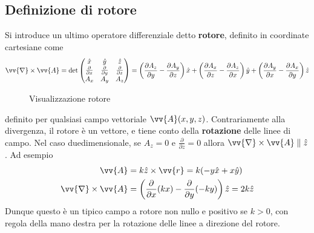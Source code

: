 \documentclass[a4paper, oneside]{book}
\begin{document}
\subsection{Definizione di rotore}
Si introduce un ultimo operatore differenziale detto \textbf{rotore}, definito 
in coordinate cartesiane come 
\begin{align}
    \vv{\nabla} \times \vv{A} = \det\begin{pmatrix}
        \hat{x} & \hat{y} & \hat{z} \\
        \frac{\partial }{\partial x} & \frac{\partial }{\partial y} & \frac{\partial }{\partial z} \\
        A_x & A_y & A_z      
    \end{pmatrix}  = \left(\frac{\partial A_z}{\partial y} - \frac{\partial A_y}{\partial z}  \right)\hat{x} + \left(\frac{\partial A_x}{\partial z} - \frac{\partial A_z}{\partial x}  \right) \hat{y} + \left(\frac{\partial A_y}{\partial x} - \frac{\partial A_x}{\partial y}  \right) \hat{z}   
\end{align}


\begin{figure}
    \centering
    \caption{Visualizzazione rotore}
\end{figure}\noindent
definito per qualsiasi campo vettoriale $\vv{A}(x, y, z)$. Contrariamente alla divergenza, il rotore è 
un vettore, e tiene conto della \textbf{rotazione} delle linee di campo. 
Nel caso duedimensionale, se $A_z = 0$ e $\frac{\partial }{\partial z} = 0$ allora 
$\vv{\nabla} \times \vv{A} \parallel \hat{z}$. Ad esempio 
\begin{align*}
    \vv{A} &= k\hat{z} \times \vv{r} = k(-y\hat{x} + x\hat{y}  ) \\
    \vv{\nabla}\times \vv{A}& = \left(\frac{\partial }{\partial x}(kx) - \frac{\partial }{\partial y} (-ky)  \right) \hat{z} = 2k\hat{z}    
\end{align*}
Dunque questo è un tipico campo a rotore non nullo 
e positivo se $k > 0$, con regola della mano destra
per la rotazione delle linee a direzione del rotore.
\end{document}
